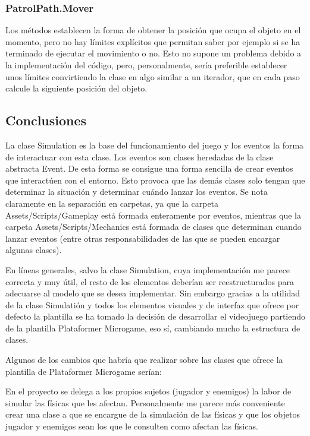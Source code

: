 \subsubsection{PatrolPath.Mover}
Los métodos establecen la forma de obtener la posición que ocupa el objeto en el momento, pero no hay límites explícitos que permitan saber por ejemplo si se ha terminado de ejecutar el movimiento o no. Esto no supone un problema debido a la implementación del código, pero, personalmente, sería preferible establecer unos límites convirtiendo la clase en algo similar a un iterador, que en cada paso calcule la siguiente posición del objeto.

\subsection{Conclusiones}
La clase Simulation es la base del funcionamiento del juego y los eventos la forma de interactuar con esta clase. Los eventos son clases heredadas de la clase abstracta Event. De esta forma se consigue una forma sencilla de crear eventos que interactúen con el entorno. Esto provoca que las demás clases solo tengan que determinar la situación y determinar cuándo lanzar los eventos. Se nota claramente en la separación en carpetas, ya que la carpeta Assets/Scripts/Gameplay está formada enteramente por eventos, mientras que la carpeta Assets/Scripts/Mechanics está formada de clases que determinan cuando lanzar eventos (entre otras responsabilidades de las que se pueden encargar algunas clases).

En líneas generales, salvo la clase Simulation, cuya implementación me parece correcta y muy útil, el resto de los elementos deberían ser reestructurados para adecuarse al modelo que se desea implementar. Sin embargo gracias a la utilidad de la clase Simulatión y todos los elementos visuales y de interfaz que ofrece por defecto la plantilla se ha tomado la decisión de desarrollar el videojuego partiendo de la plantilla Plataformer Microgame, eso sí, cambiando mucho la estructura de clases.

Algunos de los cambios que habría que realizar sobre las clases que ofrece la plantilla de Plataformer Microgame serían:

En el proyecto se delega a los propios sujetos (jugador y enemigos) la labor de simular las físicas que les afectan. Personalmente me parece más conveniente crear una clase a que se encargue de la simulación de las físicas y que los objetos jugador y enemigos sean los que le consulten como afectan las físicas. 

